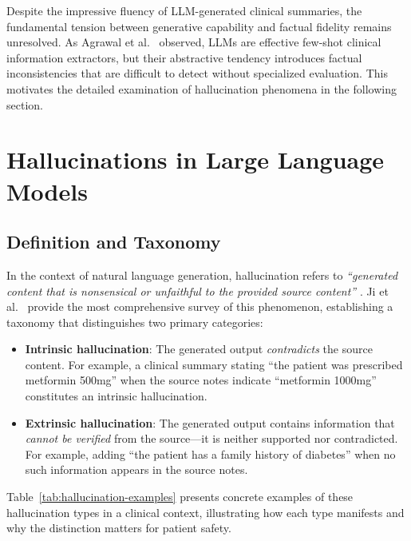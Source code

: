 \documentclass[12pt,a4paper,oneside]{report}
\begin{document}
Despite the impressive fluency of LLM-generated clinical summaries, the fundamental tension between generative capability and factual fidelity remains unresolved. As Agrawal et al.~\cite{agrawal2022llmclinical} observed, LLMs are effective few-shot clinical information extractors, but their abstractive tendency introduces factual inconsistencies that are difficult to detect without specialized evaluation. This motivates the detailed examination of hallucination phenomena in the following section.


\section{Hallucinations in Large Language Models}
\label{sec:hallucinations}

\subsection{Definition and Taxonomy}
\label{subsec:hallucination-definition}

In the context of natural language generation, hallucination refers to \textit{``generated content that is nonsensical or unfaithful to the provided source content''} \cite{maynez2020faithfulness}. Ji et al.~\cite{ji2023hallucination} provide the most comprehensive survey of this phenomenon, establishing a taxonomy that distinguishes two primary categories:

\begin{itemize}
    \item \textbf{Intrinsic hallucination}: The generated output \textit{contradicts} the source content. For example, a clinical summary stating ``the patient was prescribed metformin 500mg'' when the source notes indicate ``metformin 1000mg'' constitutes an intrinsic hallucination.
    
    \item \textbf{Extrinsic hallucination}: The generated output contains information that \textit{cannot be verified} from the source---it is neither supported nor contradicted. For example, adding ``the patient has a family history of diabetes'' when no such information appears in the source notes.
\end{itemize}

Table~\ref{tab:hallucination-examples} presents concrete examples of these hallucination types in a clinical context, illustrating how each type manifests and why the distinction matters for patient safety.
\end{document}
